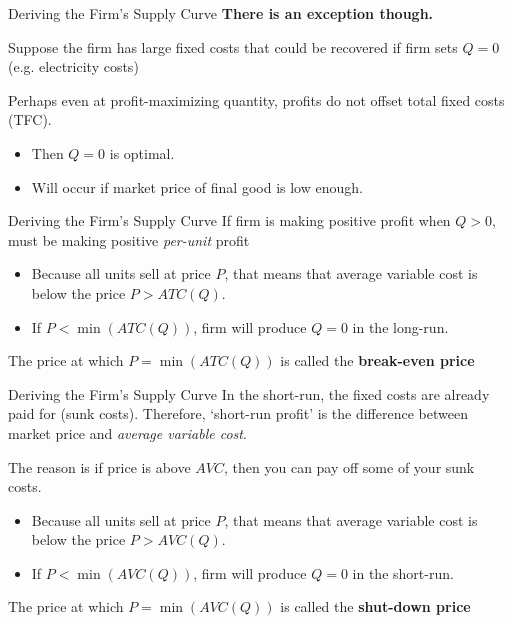 \documentclass{beamer}
\begin{document}
\begin{frame}{Deriving the Firm's Supply Curve}
  \textbf{There is an exception though.}

  \bigskip
  Suppose the firm has large fixed costs that could be recovered if firm sets $Q = 0$ (e.g. electricity costs)

  \smallskip
  Perhaps even at profit-maximizing quantity, profits do not offset total fixed costs (TFC).
  \begin{itemize}
    \item Then $Q=0$ is optimal.
    \item Will occur if market price of final good is low enough.
  \end{itemize}
\end{frame}

\begin{frame}{Deriving the Firm's Supply Curve}
  If firm is making positive profit when $Q > 0$, must be making positive \textit{per-unit} profit

  \begin{itemize}
    \item Because all units sell at price $P$, that means that average variable cost is below the price $P > ATC(Q)$.
    
    \item If $P < \min(ATC(Q))$, firm will produce $Q=0$ in the long-run. 
  \end{itemize}
  
  \bigskip
  The price at which $P = \min(ATC(Q))$ is called the \textbf{break-even price}
\end{frame}

\begin{frame}{Deriving the Firm's Supply Curve}
  In the short-run, the fixed costs are already paid for (sunk costs). Therefore, `short-run profit' is the difference between market price and \emph{average variable cost}. 

  The reason is if price is above $AVC$, then you can pay off some of your sunk costs. 

  \begin{itemize}
    \item Because all units sell at price $P$, that means that average variable cost is below the price $P > AVC(Q)$.
    
    \item If $P < \min(AVC(Q))$, firm will produce $Q=0$ in the short-run.
  \end{itemize}
  
  \bigskip
  The price at which $P = \min(AVC(Q))$ is called the \textbf{shut-down price}
\end{frame}
\end{document}
